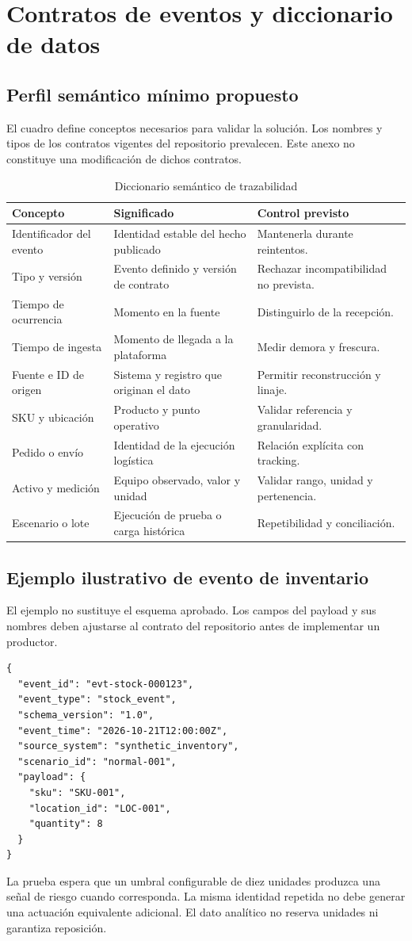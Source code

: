 \documentclass[11pt,a4paper]{article}
\newcommand{\Seccion}[1]{\FloatBarrier\Needspace{5\baselineskip}\section{#1}}
\begin{document}
\clearpage
\Seccion{Contratos de eventos y diccionario de datos}\label{anexo:contratos}
\subsection{Perfil semántico mínimo propuesto}
El cuadro define conceptos necesarios para validar la solución. Los nombres y tipos de los contratos vigentes del repositorio prevalecen. Este anexo no constituye una modificación de dichos contratos.
\begin{table}[H]
\caption{Diccionario semántico de trazabilidad}\label{tab:diccionario}
\small\begin{tabularx}{\linewidth}{@{}P{.28\linewidth}YY@{}}\toprule
Concepto & Significado & Control previsto\\\midrule
Identificador del evento & Identidad estable del hecho publicado & Mantenerla durante reintentos.\\
Tipo y versión & Evento definido y versión de contrato & Rechazar incompatibilidad no prevista.\\
Tiempo de ocurrencia & Momento en la fuente & Distinguirlo de la recepción.\\
Tiempo de ingesta & Momento de llegada a la plataforma & Medir demora y frescura.\\
Fuente e ID de origen & Sistema y registro que originan el dato & Permitir reconstrucción y linaje.\\
SKU y ubicación & Producto y punto operativo & Validar referencia y granularidad.\\
Pedido o envío & Identidad de la ejecución logística & Relación explícita con tracking.\\
Activo y medición & Equipo observado, valor y unidad & Validar rango, unidad y pertenencia.\\
Escenario o lote & Ejecución de prueba o carga histórica & Repetibilidad y conciliación.\\\bottomrule
\end{tabularx}
\end{table}

\subsection{Ejemplo ilustrativo de evento de inventario}
El ejemplo no sustituye el esquema aprobado. Los campos del payload y sus nombres deben ajustarse al contrato del repositorio antes de implementar un productor.
\begin{lstlisting}
{
  "event_id": "evt-stock-000123",
  "event_type": "stock_event",
  "schema_version": "1.0",
  "event_time": "2026-10-21T12:00:00Z",
  "source_system": "synthetic_inventory",
  "scenario_id": "normal-001",
  "payload": {
    "sku": "SKU-001",
    "location_id": "LOC-001",
    "quantity": 8
  }
}
\end{lstlisting}
La prueba espera que un umbral configurable de diez unidades produzca una señal de riesgo cuando corresponda. La misma identidad repetida no debe generar una actuación equivalente adicional. El dato analítico no reserva unidades ni garantiza reposición.
\end{document}
